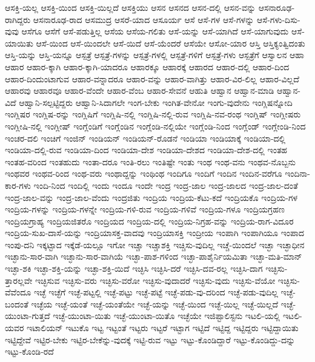 {ಆಸಕ್ತಿ-ಯಲ್ಲ
ಆಸಕ್ತಿ-ಯಿಂದ
ಆಸಕ್ತಿ-ಯಿಲ್ಲದೆ
ಆಸಕ್ತಿಯು
ಆಸನ
ಆಸನದ
ಆಸನ-ದಲ್ಲಿ
ಆಸನ-ವನ್ನು
ಆಸನಾರೂಢ-ರಾಗಿದ್ದರು
ಆಸನಾರೂಢ-ರಾದ
ಆಸಮುದ್ರ
ಆಸರೆ-ಯಾದ
ಆಸೂರ್ಯ
ಆಸೆ
ಆಸೆ-ಗಳ
ಆಸೆ-ಗಳನ್ನು
ಆಸೆ-ಗಳು-ದಿಸು-ವುವು
ಆಸೆಗೂ
ಆಸೆಗೆ
ಆಸೆ-ಪಡುತ್ತಿಲ್ಲ
ಆಸೆಯ
ಆಸೆಯ-ಗಲಿತು
ಆಸೆ-ಯನ್ನು
ಆಸೆ-ಯಾಗಿದೆ
ಆಸೆ-ಯಾಗುವುದು
ಆಸೆ-ಯಾಯಿತು
ಆಸೆ-ಯಿಂದ
ಆಸೆ-ಯಿಂದಲೇ
ಆಸೆ-ಯಿದೆ
ಆಸೆ-ಯೆಂದರೆ
ಆಸೆಯೇ
ಆಸೋ-ಯಾರ
ಆಸ್ತಿ
ಆಸ್ತಿಕ್ಯಂತ್ವಿದಂತು
ಆಸ್ತಿ-ಯನ್ನು
ಆಸ್ತಿ-ಯನ್ನೂ
ಆಸ್ಪತ್ರೆ
ಆಸ್ಪತ್ರೆ-ಗಳನ್ನು
ಆಸ್ಪತ್ರೆ-ಗಳಲ್ಲಿ
ಆಸ್ಪತ್ರೆ-ಗಳಿಗೆ
ಆಸ್ಪತ್ರೆ-ಗಳು
ಆಸ್ಪತ್ರೆಗೆ
ಆಸ್ವಾಲನ
ಆಹಾ
ಆಹಾರ
ಆಹಾರ-ಕ್ಕಾಗಿ
ಆಹಾರ-ಕ್ಕಾಗಿ-ಯಾದರೂ
ಆಹಾರಕ್ಕೂ
ಆಹಾರಕ್ಕೆ
ಆಹಾರದ
ಆಹಾರ-ದಲ್ಲಿ
ಆಹಾರ-ದಿಂದ
ಆಹಾರ-ದಿಂದುಂಟಾಗುವ
ಆಹಾರ-ವನ್ನಾದರೂ
ಆಹಾರ-ವನ್ನು
ಆಹಾರ-ವಾಗಿತ್ತು
ಆಹಾರ-ವಿರ-ಲಿಲ್ಲ
ಆಹಾರ-ವಿಲ್ಲದೆ
ಆಹಾರವು
ಆಹಾರವೂ
ಆಹಾರ-ವೆಂದೇ
ಆಹಾರ-ವೆಂಬ
ಆಹಾರ-ಸೇವನೆ
ಆಹುತಿ
ಆಹ್ವಾನ
ಆಹ್ವಾನ-ಮಾಡಿ
ಆಹ್ವಾನ-ವಿದೆ
ಆಹ್ವಾನಿ-ಸಲ್ಪಟ್ಟಿದ್ದರು
ಆಹ್ವಾನಿ-ಸಿದಾಗಲೇ
ಇಂಗ-ಬೇಕು
ಇಂಗಿತ-ವೇನೋ
ಇಂಗು-ವುದೇನು
ಇಂಗ್ಲಿಷನ್ನೋದಿ
ಇಂಗ್ಲಿಷರ
ಇಂಗ್ಲಿಷ-ರನ್ನು
ಇಂಗ್ಲಿಷಿಗೆ
ಇಂಗ್ಲಿಷಿ-ನಲ್ಲಿ
ಇಂಗ್ಲಿಷಿ-ನಲ್ಲಿ-ರುವ
ಇಂಗ್ಲಿಷಿ-ನವ-ರಂಥ
ಇಂಗ್ಲಿಷ್
ಇಂಗ್ಲೀಷರು
ಇಂಗ್ಲೀಷಿ-ನಲ್ಲಿ
ಇಂಗ್ಲೀಷ್
ಇಂಗ್ಲೆಂಡಿಗೆ
ಇಂಗ್ಲೆಂಡಿನ
ಇಂಗ್ಲೆಂಡಿ-ನಲ್ಲಿಯೇ
ಇಂಗ್ಲೆಂಡಿ-ನಿಂದ
ಇಂಗ್ಲೆಂಡ್
ಇಂಗ್ಲೇಂಡಿ-ನಿಂದ
ಇಂಚರ-ದಲಿ
ಇಂಚಿಗೆ
ಇಂಜಿನ್
ಇಂಡಿಯನ್
ಇಂಡಿಯನ್-ರೊಡನೆ
ಇಂಡಿಯಾ
ಇಂಡಿಯಾಕ್ಕೆ
ಇಂಡಿಯಾ-ದಲ್ಲಿ
ಇಂಡಿಯಾ-ದಲ್ಲಿ-ರುವ
ಇಂಡಿಯಾ-ದಿಂದ
ಇಂಡಿಯಾ-ದೇಶ
ಇಂಡಿಯಾ-ದೇಶದ
ಇಂಡಿಯಾ-ದೇಶ-ದಲ್ಲಿ
ಇಂತಹ
ಇಂತಹ-ವರಿಂದ
ಇಂತಹುದು
ಇಂತಾ-ದರೂ
ಇಂತಿ-ರಲು
ಇಂತಿಷ್ಟೇ
ಇಂತು
ಇಂಥ
ಇಂಥ-ವನು
ಇಂಥವ-ನೊಬ್ಬನು
ಇಂಥವರ
ಇಂಥವ-ರಿಂದ
ಇಂಥ-ವರು
ಇಂಥಾದ್ದನ್ನು
ಇಂಥಿಂಥ
ಇಂದಿಗೂ
ಇಂದಿಗೆ
ಇಂದಿನ
ಇಂದಿನ-ವರೆಗೂ
ಇಂದಿನಾ-ಕಾರ-ಗಳು
ಇಂದಿ-ನಿಂದ
ಇಂದಿಲ್ಲಿ
ಇಂದು
ಇಂದೂ
ಇಂದೇ
ಇಂದ್ರ
ಇಂದ್ರ-ಜಾಲ
ಇಂದ್ರ-ಜಾಲದ
ಇಂದ್ರ-ಜಾಲ-ದಂತೆ
ಇಂದ್ರ-ಜಾಲ-ವನ್ನು
ಇಂದ್ರ-ಜಾಲ-ವೆಂದು
ಇಂದ್ರಜಿತು
ಇಂದ್ರಿಯ
ಇಂದ್ರಿಯ-ಕೆಟು-ಕದೆ
ಇಂದ್ರಿಯಕೊ
ಇಂದ್ರಿಯ-ಗಳ
ಇಂದ್ರಿಯ-ಗಳನ್ನು
ಇಂದ್ರಿಯ-ಗಳನ್ನೇ
ಇಂದ್ರಿಯ-ಗಳಿ-ರುವ
ಇಂದ್ರಿಯ-ಗಳಿವೆ
ಇಂದ್ರಿಯ-ಗಳೂ
ಇಂದ್ರಿಯಗ್ರಹಣ
ಇಂದ್ರಿಯಗ್ರಾಹ್ಯ
ಇಂದ್ರಿಯಜಿತರೊ
ಇಂದ್ರಿಯದ
ಇಂದ್ರಿಯ-ದಲ್ಲಿ
ಇಂದ್ರಿಯ-ನಿಗ್ರಹ-ವನ್ನು
ಇಂದ್ರಿಯ-ರಾಗ-ವಿದೂರ
ಇಂದ್ರಿಯ-ಸುಖ-ದಾಸೆ-ಯನ್ನು
ಇಂದ್ರಿಯಾಸಕ್ತ-ವಾದವು
ಇಂದ್ರಿಯಾಸಕ್ತಿ
ಇಂದ್ರೀಯ
ಇಂಪಾಗಿ
ಇಂಪಾಗಿಯೂ
ಇಂಪಾದ
ಇಂಪು-ದನಿ
ಇಕ್ಕಟ್ಟಾದ
ಇಕ್ಕೆಡೆ-ಯಲ್ಲೂ
ಇಗೋ
ಇಚ್ಚಾ
ಇಚ್ಚಾಶಕ್ತಿ
ಇಚ್ಚಿಸು-ವುದಿಲ್ಲ
ಇಚ್ಚೆ-ಯಿಂದಲೆ
ಇಚ್ಛಾ
ಇಚ್ಛಾಧೀನ
ಇಚ್ಛಾನು-ಸಾರ-ವಾಗಿ
ಇಚ್ಛಾನು-ಸಾರ-ವಾಗಿಯೆ
ಇಚ್ಛಾ-ಪಾಶ-ಗಳಿಂದ
ಇಚ್ಛಾ-ಪಾಶೈರ್ನಿಯಮಿತಾ
ಇಚ್ಛಾ-ಮತಿ-ಮಾನ್
ಇಚ್ಛಾ-ಶಕಿ
ಇಚ್ಛಾ-ಶಕ್ತಿ-ಯನ್ನು
ಇಚ್ಛಾ-ಶಕ್ತಿ-ಯಿದೆ
ಇಚ್ಛಿಸಿ
ಇಚ್ಛಿಸಿ-ದರೆ
ಇಚ್ಛಿಸಿ-ದವ-ರಲ್ಲ
ಇಚ್ಛಿಸಿ-ದಾಗ
ಇಚ್ಛಿಸು-ತ್ತಾರಲ್ಲವೇ
ಇಚ್ಛಿಸುವ
ಇಚ್ಛಿಸು-ವರು
ಇಚ್ಛಿಸು-ವರೋ
ಇಚ್ಛಿಸು-ವುದಾದರೆ
ಇಚ್ಛಿಸು-ವುದು
ಇಚ್ಛಿಸು-ವೆಯೋ
ಇಚ್ಛಿಸು-ವೆವೆಂದೂ
ಇಚ್ಛೆ
ಇಚ್ಛೆಗೆ
ಇಚ್ಛೆ-ಪಟ್ಟಲ್ಲಿ
ಇಚ್ಛೆ-ಪಟ್ಟು
ಇಚ್ಛೆ-ಪಟ್ಟೆ
ಇಚ್ಛೆ-ಪಡು-ವು-ದರಿಂದ
ಇಚ್ಛೆ-ಪಡು-ವುದಿಲ್ಲ
ಇಚ್ಛೆ-ಬಂದಂತೆ
ಇಚ್ಛೆಯ
ಇಚ್ಛೆ-ಯಂತೆ
ಇಚ್ಛೆ-ಯಂತೆಯೇ
ಇಚ್ಛೆ-ಯನ್ನು
ಇಚ್ಛೆ-ಯಿಂದ
ಇಚ್ಛೆ-ಯಿಲ್ಲ
ಇಚ್ಛೆ-ಯಿಲ್ಲದೆ
ಇಚ್ಛೆ-ಯುಂಟಾ-ಗುತ್ತದೆ
ಇಚ್ಛೆ-ಯುಂಟಾ-ಯಿತು
ಇಚ್ಛೆ-ಯುಂಟಾ-ಯಿತೊ
ಇಚ್ಛೆಯೇ
ಇಜಿಪ್ಟಾಲಿಸ್ಟನು
ಇಟಲಿ-ಯಲ್ಲಿ
ಇಟಲಿ-ಯವರ
ಇಟಾಲಿಯನ್
ಇಟುಕೊ
ಇಟ್ಟ
ಇಟ್ಟಂತೆ
ಇಟ್ಟರು
ಇಟ್ಟರೆ
ಇಟ್ಟಾಗ
ಇಟ್ಟಿದೆ
ಇಟ್ಟಿದ್ದ
ಇಟ್ಟಿದ್ದರು
ಇಟ್ಟಿದ್ದಾಯಿತು
ಇಟ್ಟಿದ್ದೇವೆ
ಇಟ್ಟಿರ-ಬೇಕು
ಇಟ್ಟಿರ-ಬೇಕೆನ್ನು-ವುದಕ್ಕೆ
ಇಟ್ಟಿ-ರುವ
ಇಟ್ಟು
ಇಟ್ಟು-ಕೊಂಡಿದ್ದಾರೆ
ಇಟ್ಟು-ಕೊಂಡಿದ್ದು-ದನ್ನು
ಇಟ್ಟು-ಕೊಂಡಿ-ರದೆ
}
